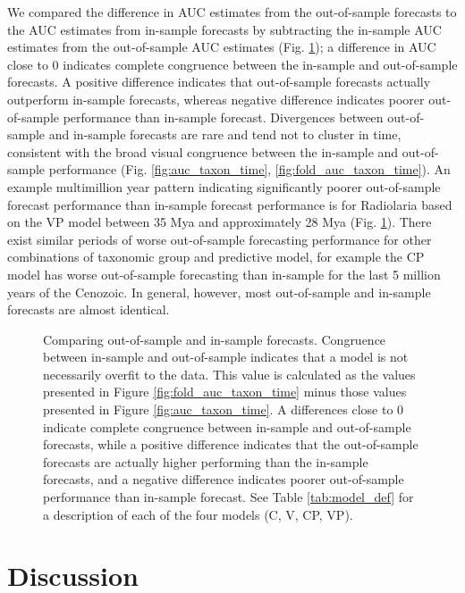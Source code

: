 \documentclass[12pt,letterpaper]{article}
\begin{document}
\begin{refsection}
We compared the difference in AUC estimates from the out-of-sample forecasts to the AUC estimates from in-sample forecasts by subtracting the in-sample AUC estimates from the out-of-sample AUC estimates (Fig. \ref{fig:oos_ins_diff}); a difference in AUC close to 0 indicates complete congruence between the in-sample and out-of-sample forecasts. A positive difference indicates that out-of-sample forecasts actually outperform in-sample forecasts, whereas negative difference indicates poorer out-of-sample performance than in-sample forecast. Divergences between out-of-sample and in-sample forecasts are rare and tend not to cluster in time, consistent with the broad visual congruence between the in-sample and out-of-sample performance (Fig. \ref{fig:auc_taxon_time}, \ref{fig:fold_auc_taxon_time}). An example multimillion year pattern indicating significantly poorer out-of-sample forecast performance than in-sample forecast performance is for Radiolaria based on the VP model between 35 Mya and approximately 28 Mya (Fig. \ref{fig:oos_ins_diff}). There exist similar periods of worse out-of-sample forecasting performance for other combinations of taxonomic group and predictive model, for example the CP model has worse out-of-sample forecasting than in-sample for the last 5 million years of the Cenozoic. In general, however, most out-of-sample and in-sample forecasts are almost identical.

\begin{figure}[ht]
 \centering
 \caption{Comparing out-of-sample and in-sample forecasts. Congruence between in-sample and out-of-sample indicates that a model is not necessarily overfit to the data. This value is calculated as the values presented in Figure \ref{fig:fold_auc_taxon_time} minus those values presented in Figure \ref{fig:auc_taxon_time}. A differences close to 0 indicate complete congruence between in-sample and out-of-sample forecasts, while a positive difference indicates that the out-of-sample forecasts are actually higher performing than the in-sample forecasts, and a negative difference indicates poorer out-of-sample performance than in-sample forecast. See Table \ref{tab:model_def} for a description of each of the four models (C, V, CP, VP).}
 \label{fig:oos_ins_diff}
\end{figure}




\section{Discussion}


\end{refsection}
\end{document}
